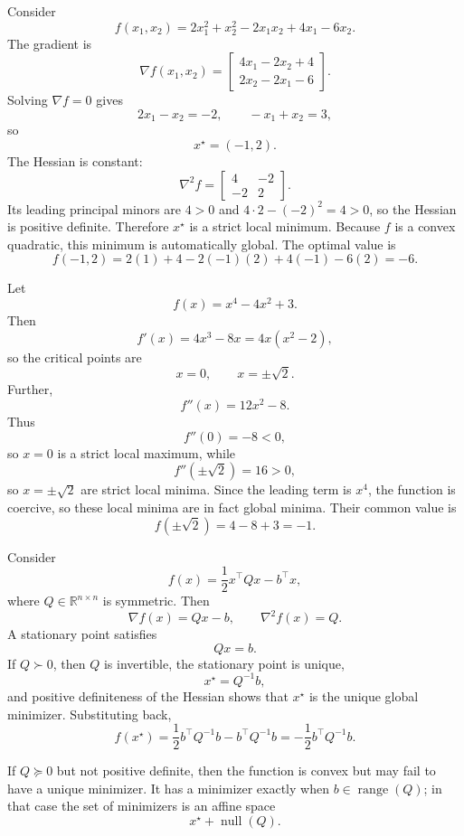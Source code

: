 \begin{eg}
	Consider
	\[
		f(x_1,x_2)=2x_1^2+x_2^2-2x_1x_2+4x_1-6x_2.
	\]
	The gradient is
	\[
		\nabla f(x_1,x_2)=
		\begin{bmatrix}
			4x_1-2x_2+4 \\
			2x_2-2x_1-6
		\end{bmatrix}.
	\]
	Solving $\nabla f=0$ gives
	\[
		2x_1-x_2=-2,
		\qquad
		-x_1+x_2=3,
	\]
	so
	\[
		x^\star = (-1,2).
	\]
	The Hessian is constant:
	\[
		\nabla^2 f=
		\begin{bmatrix}
			4  & -2 \\
			-2 & 2
		\end{bmatrix}.
	\]
	Its leading principal minors are $4>0$ and $4\cdot 2-(-2)^2=4>0$, so the Hessian is positive definite. Therefore $x^\star$ is a strict local minimum. Because $f$ is a convex quadratic, this minimum is automatically global. The optimal value is
	\[
		f(-1,2)=2(1)+4-2(-1)(2)+4(-1)-6(2)=-6.
	\]
\end{eg}

\begin{eg}
	Let
	\[
		f(x)=x^4-4x^2+3.
	\]
	Then
	\[
		f'(x)=4x^3-8x=4x(x^2-2),
	\]
	so the critical points are
	\[
		x=0, \qquad x=\pm \sqrt{2}.
	\]
	Further,
	\[
		f''(x)=12x^2-8.
	\]
	Thus
	\[
		f''(0)=-8<0,
	\]
	so $x=0$ is a strict local maximum, while
	\[
		f''(\pm \sqrt{2}) = 16 > 0,
	\]
	so $x=\pm \sqrt{2}$ are strict local minima. Since the leading term is $x^4$, the function is coercive, so these local minima are in fact global minima. Their common value is
	\[
		f(\pm \sqrt{2}) = 4-8+3=-1.
	\]
\end{eg}

\begin{eg}
	Consider
	\[
		f(x)=\frac{1}{2}x^\top Qx-b^\top x,
	\]
	where $Q \in \mathbb{R}^{n \times n}$ is symmetric.
	Then
	\[
		\nabla f(x)=Qx-b,
		\qquad
		\nabla^2 f(x)=Q.
	\]
	A stationary point satisfies
	\[
		Qx=b.
	\]
	If $Q \succ 0$, then $Q$ is invertible, the stationary point is unique,
	\[
		x^\star = Q^{-1}b,
	\]
	and positive definiteness of the Hessian shows that $x^\star$ is the unique global minimizer. Substituting back,
	\[
		f(x^\star)=\frac{1}{2}b^\top Q^{-1}b - b^\top Q^{-1}b
		= -\frac{1}{2}b^\top Q^{-1}b.
	\]

	If $Q \succeq 0$ but not positive definite, then the function is convex but may fail to have a unique minimizer. It has a minimizer exactly when $b \in \operatorname{range}(Q)$; in that case the set of minimizers is an affine space
	\[
		x^\star + \operatorname{null}(Q).
	\]
\end{eg}

